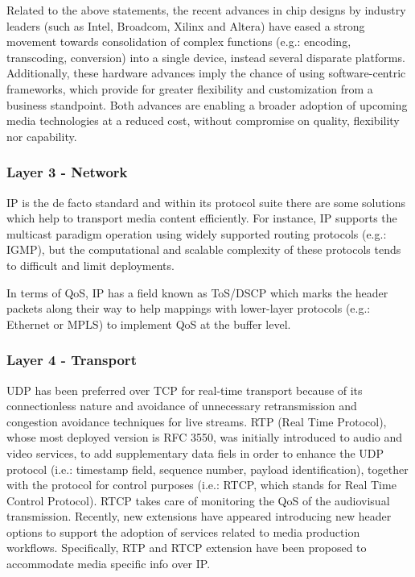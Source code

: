 Related to the above statements, the recent advances in chip designs by industry leaders (such as Intel, Broadcom, Xilinx and Altera) have eased a strong movement towards consolidation of complex functions (e.g.: encoding, transcoding, conversion) into a single device, instead several disparate platforms. Additionally, these hardware advances imply the chance of using software-centric frameworks, which provide for greater flexibility and customization from a business standpoint. Both advances are enabling a broader adoption of upcoming media technologies at a reduced cost, without compromise on quality, flexibility nor capability. 

\subsubsection{Layer 3 - Network}

IP is the de facto standard and within its protocol suite there are some solutions which help to transport media content efficiently. For instance, IP supports the multicast \cite{mc} paradigm operation using widely supported routing protocols (e.g.: IGMP), but the computational and scalable complexity of these protocols tends to difficult and limit deployments.

In terms of QoS, IP has a field known as ToS/DSCP \cite{tosdscp} which marks the header packets along their way to help mappings with lower-layer protocols (e.g.: Ethernet or MPLS) to implement QoS at the buffer level.

\subsubsection{Layer 4 - Transport}

UDP has been preferred over TCP for real-time transport because of its connectionless nature and avoidance of unnecessary retransmission and congestion avoidance techniques for live streams. RTP (Real Time Protocol), whose most deployed version is RFC 3550, was initially introduced to audio and video services, to add supplementary data fiels in order to enhance the UDP protocol (i.e.: timestamp field, sequence number, payload identification), together with the protocol for control purposes (i.e.: RTCP, which stands for Real Time Control Protocol). RTCP takes care of monitoring the QoS of the audiovisual transmission. Recently, new extensions have appeared introducing new header options to support the adoption of services related to media production workflows. Specifically, RTP and RTCP extension have been proposed to accommodate media specific info over IP.

